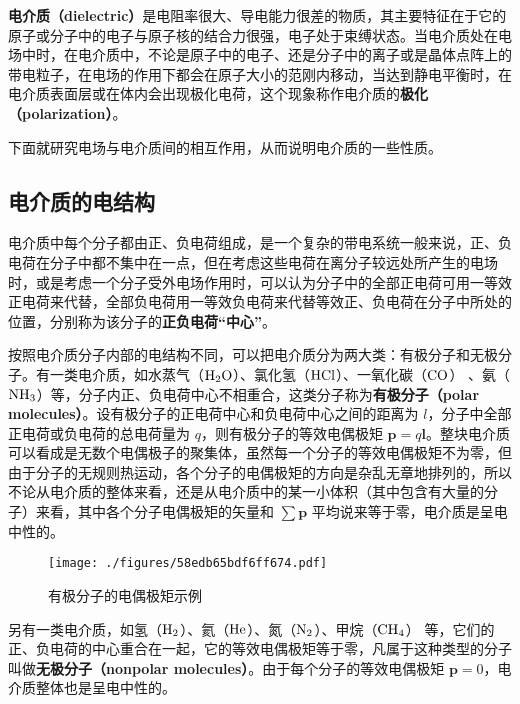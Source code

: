 
\begin{issues}
\end{issues}


\textbf{电介质（dielectric）}是电阻率很大、导电能力很差的物质，其主要特征在于它的原子或分子中的电子与原子核的结合力很强，电子处于束缚状态。当电介质处在电场中时，在电介质中，不论是原子中的电子、还是分子中的离子或是晶体点阵上的带电粒子，在电场的作用下都会在原子大小的范刚内移动，当达到静电平衡时，在电介质表面层或在体内会出现极化电荷，这个现象称作电介质的\textbf{极化（polarization）}。

下面就研究电场与电介质间的相互作用，从而说明电介质的一些性质。

\subsection{电介质的电结构}

电介质中每个分子都由正、负电荷组成，是一个复杂的带电系统一般来说，正、负电荷在分子中都不集中在一点，但在考虑这些电荷在离分子较远处所产生的电场时，或是考虑一个分子受外电场作用时，可以认为分子中的全部正电荷可用一等效正电荷来代替，全部负电荷用一等效负电荷来代替等效正、负电荷在分子中所处的位置，分别称为该分子的\textbf{正负电荷“中心”}。

按照电介质分子内部的电结构不同，可以把电介质分为两大类：有极分子和无极分子。有一类电介质，如水蒸气（$\rm H_2O$）、氯化氢（$\rm HCl$）、一氧化碳（$\rm CO$） 、氨（$\rm NH_3$）等，分子内正、负电荷中心不相重合，这类分子称为\textbf{有极分子（polar molecules）}。设有极分子的正电荷中心和负电荷中心之间的距离为 $l$，分子中全部正电荷或负电荷的总电荷量为 $q$，则有极分子的等效电偶极矩 $\mathbf p=q\mathbf l$。整块电介质可以看成是无数个电偶极子的聚集体，虽然每一个分子的等效电偶极矩不为零，但由于分子的无规则热运动，各个分子的电偶极矩的方向是杂乱无章地排列的，所以不论从电介质的整体来看，还是从电介质中的某一小体积（其中包含有大量的分子）来看，其中各个分子电偶极矩的矢量和 $\sum \mathbf p$ 平均说来等于零，电介质是呈电中性的。
\begin{figure}[ht]
\centering
\texttt{[image: ./figures/58edb65bdf6ff674.pdf]}
\caption{有极分子的电偶极矩示例} \label{fig_Dielec_1}
\end{figure}
另有一类电介质，如氢（$\rm H_2$）、氦（$\rm He$）、氮（$\rm N_2$）、甲烷（$\rm CH_4$） 等，它们的正、负电荷的中心重合在一起，它的等效电偶极矩等于零，凡属于这种类型的分子叫做\textbf{无极分子（nonpolar molecules）}。由于每个分子的等效电偶极矩 $\mathbf p=0$，电介质整体也是呈电中性的。

